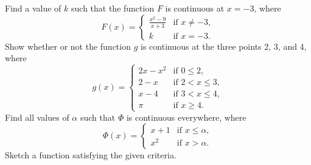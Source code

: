 \begin{questions}
  \questioE Find a value of $ k $ such that the function $ F $ is continuous at $ x = -3 $, where
            \begin{displaymath}
              F(x) =
              \begin{cases}
                \frac{x^2 - 9}{x+3} & \text{if } x \neq -3,\\
                k                   & \text{if } x = -3.
              \end{cases}
            \end{displaymath}
  \questioE Show whether or not the function $ g $ is continuous at the three points 2, 3, and 4, where
            \begin{displaymath}
              g(x) =
              \begin{cases}
                2x-x^2              & \text{if } 0 \leq 2,\\
                2-x                 & \text{if } 2 < x \leq 3,\\
                x-4                 & \text{if } 3 < x \leq 4,\\
                \pi                 & \text{if } x \geq 4.
              \end{cases}
            \end{displaymath}
  \questioE Find all values of $ \alpha $ such that $ \Phi $ is continuous everywhere, where
            \begin{displaymath}
              \Phi(x) =
              \begin{cases}
                x+1                 & \text{if } x \leq \alpha, \\
                x^2                 & \text{if } x > \alpha.
              \end{cases}
            \end{displaymath}
  \questioM Sketch a function satisfying the given criteria.
\end{questions}
